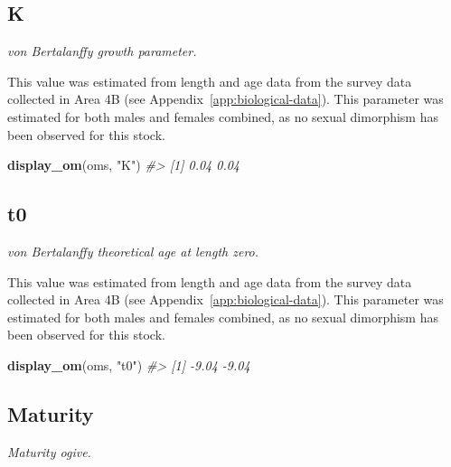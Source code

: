 \documentclass[11pt]{book}
\newenvironment{Shaded}{}{}
\newcommand{\KeywordTok}[1]{\textcolor[rgb]{0.00,0.44,0.13}{\textbf{{#1}}}}
\newcommand{\StringTok}[1]{\textcolor[rgb]{0.25,0.44,0.63}{{#1}}}
\newcommand{\CommentTok}[1]{\textcolor[rgb]{0.38,0.63,0.69}{\textit{{#1}}}}
\newcommand{\NormalTok}[1]{{#1}}
\begin{document}
\subsection{K}

\emph{von Bertalanffy growth parameter.}

This value was estimated from length and age data from the survey data collected in Area 4B (see Appendix~\ref{app:biological-data}). This parameter was estimated for both males and females combined, as no sexual dimorphism has been observed for this stock.
\begin{Shaded}
\begin{Highlighting}[]
\KeywordTok{display_om}\NormalTok{(oms, }\StringTok{"K"}\NormalTok{)}
\CommentTok{#> [1] 0.04 0.04}
\end{Highlighting}
\end{Shaded}
\label{app:desc-stock-t0-yelloweye}
\subsection{t0}

\emph{von Bertalanffy theoretical age at length zero.}

This value was estimated from length and age data from the survey data collected in Area 4B (see Appendix~\ref{app:biological-data}). This parameter was estimated for both males and females combined, as no sexual dimorphism has been observed for this stock.
\begin{Shaded}
\begin{Highlighting}[]
\KeywordTok{display_om}\NormalTok{(oms, }\StringTok{"t0"}\NormalTok{)}
\CommentTok{#> [1] -9.04 -9.04}
\end{Highlighting}
\end{Shaded}
\label{app:desc-stock-maturity-yelloweye}
\subsection{Maturity}

\emph{Maturity ogive.}
\end{document}
